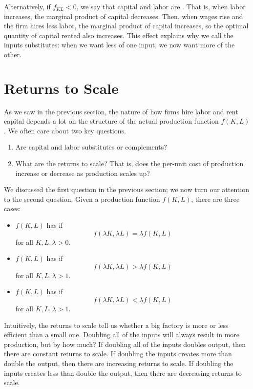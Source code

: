Alternatively, if $f_{KL} < 0$, we say that capital and labor are . That is, when labor increases, the marginal product of capital decreases. Then, when wages rise and the firm hires less labor, the marginal product of capital increases, so the optimal quantity of capital rented also increases. This effect explains why we call the inputs substitutes: when we want less of one input, we now want more of the other.

\section{Returns to Scale}
As we saw in the previous section, the nature of how firms hire labor and rent capital depends a lot on the structure of the actual production function $f(K, L)$. We often care about two key questions.
\begin{enumerate}
    \item Are capital and labor substitutes or complements?
    \item What are the returns to scale? That is, does the per-unit cost of production increase or decrease as production scales up?
\end{enumerate}
We discussed the first question in the previous section; we now turn our attention to the second question. Given a production function $f(K, L)$, there are three cases:
\begin{itemize}
    \item $f(K, L)$ has  if 
    $$f(\lambda K, \lambda L) = \lambda f(K, L)$$
    for all $K, L, \lambda > 0$.
    \item $f(K, L)$ has  if 
    $$f(\lambda K, \lambda L) > \lambda f(K, L)$$
    for all $K, L, \lambda > 1$.
    \item $f(K, L)$ has  if 
    $$f(\lambda K, \lambda L) < \lambda f(K, L)$$
    for all $K, L, \lambda > 1$.
\end{itemize}
Intuitively, the returns to scale tell us whether a big factory is more or less efficient than a small one. Doubling all of the inputs will always result in more production, but by how much? If doubling all of the inputs doubles output, then there are constant returns to scale. If doubling the inputs creates more than double the output, then there are increasing returns to scale. If doubling the inputs creates less than double the output, then there are decreasing returns to scale.

